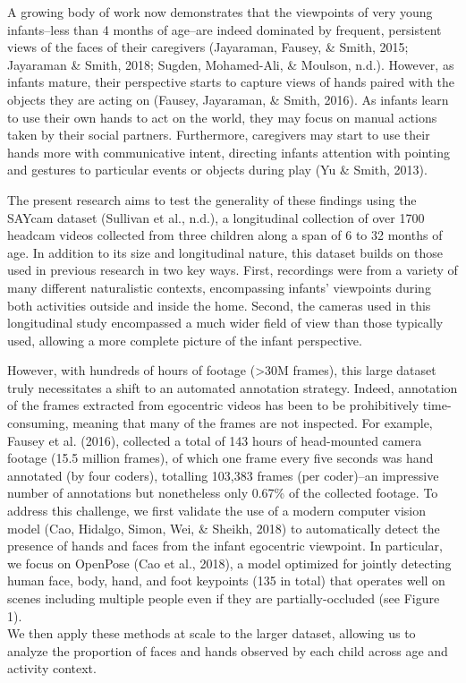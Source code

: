 \documentclass[10pt, letterpaper]{article}
\begin{document}
A growing body of work now demonstrates that the viewpoints of very
young infants--less than 4 months of age--are indeed dominated by
frequent, persistent views of the faces of their caregivers (Jayaraman,
Fausey, \& Smith, 2015; Jayaraman \& Smith, 2018; Sugden, Mohamed-Ali,
\& Moulson, n.d.). However, as infants mature, their perspective starts
to capture views of hands paired with the objects they are acting on
(Fausey, Jayaraman, \& Smith, 2016). As infants learn to use their own
hands to act on the world, they may focus on manual actions taken by
their social partners. Furthermore, caregivers may start to use their
hands more with communicative intent, directing infants attention with
pointing and gestures to particular events or objects during play (Yu \&
Smith, 2013).

The present research aims to test the generality of these findings using
the SAYcam dataset (Sullivan et al., n.d.), a longitudinal collection of
over 1700 headcam videos collected from three children along a span of 6
to 32 months of age. In addition to its size and longitudinal nature,
this dataset builds on those used in previous research in two key ways.
First, recordings were from a variety of many different naturalistic
contexts, encompassing infants' viewpoints during both activities
outside and inside the home. Second, the cameras used in this
longitudinal study encompassed a much wider field of view than those
typically used, allowing a more complete picture of the infant
perspective.

However, with hundreds of hours of footage (\textgreater{}30M frames),
this large dataset truly necessitates a shift to an automated annotation
strategy. Indeed, annotation of the frames extracted from egocentric
videos has been to be prohibitively time-consuming, meaning that many of
the frames are not inspected. For example, Fausey et al. (2016),
collected a total of 143 hours of head-mounted camera footage (15.5
million frames), of which one frame every five seconds was hand
annotated (by four coders), totalling 103,383 frames (per coder)--an
impressive number of annotations but nonetheless only 0.67\% of the
collected footage. To address this challenge, we first validate the use
of a modern computer vision model (Cao, Hidalgo, Simon, Wei, \& Sheikh,
2018) to automatically detect the presence of hands and faces from the
infant egocentric viewpoint. In particular, we focus on OpenPose (Cao et
al., 2018), a model optimized for jointly detecting human face, body,
hand, and foot keypoints (135 in total) that operates well on scenes
including multiple people even if they are partially-occluded (see
Figure 1).\\
We then apply these methods at scale to the larger dataset, allowing us
to analyze the proportion of faces and hands observed by each child
across age and activity context.
\end{document}
